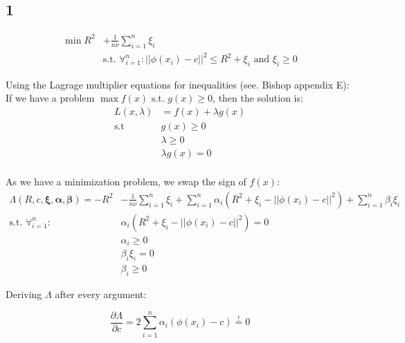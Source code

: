 \subsection*{1}

\begin{align}
    \min R^2  & + \frac{1}{n \nu} \sum_{i=1}^n \xi_i \\
              & \text{s.t. } \forall_{i=1}^n: || \phi(x_i) - c||^2 \le R^2 + \xi_i
              \text{ and } \xi_i \ge 0
\end{align}

Using the Lagrage multiplier equations for inequalities (see. Bishop appendix E):
If we have a problem $ \max  f(x)  \textrm{  s.t. } g(x) \ge 0$, then the solution is:
\begin{equation}
    \begin{split}
        L(x, \lambda) & = f(x) + \lambda g(x) \\
        \textrm{s.t } & g(x) \ge 0 \\
                      & \lambda \ge 0 \\
                      & \lambda g(x) = 0 \\
    \end{split}
\end{equation}

As we have a minimization problem, we swap the sign of $f(x)$:
\begin{align}
    \label{eq:lagrange}
    \Lambda(R, c, \bm{\xi}, \bm{\alpha}, \bm{\beta}) = - R^2  & - \frac{1}{n \nu} \sum_{i=1}^n \xi_i
               + \sum_{i=1}^n \alpha_i \left( R^2 + \xi_i - ||\phi(x_i) - c||^2 \right)
            +  \sum_{i=1}^n \beta_i \xi_i \\
        \text{s.t. } \forall_{i=1}^n:& \alpha_i \left( R^2 + \xi_i  - ||\phi(x_i) - c||^2 \right) = 0 \\
                   &  \alpha_i \ge 0 \\
        \label{eq:lbeta_xi}
                   &  \beta_i \xi_i = 0 \\
                   &  \beta_i \ge 0
\end{align}


Deriving $\Lambda$ after every argument:

\begin{equation}
    \label{eq:dc}
    \frac{\partial \Lambda}{\partial c} =
               2 \sum_{i=1}^n \alpha_i \left(\phi(x_i) - c \right) \stackrel{!}{=} 0
\end{equation}

